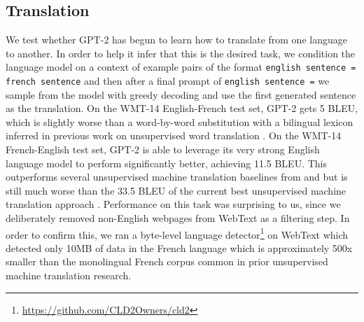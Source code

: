 \documentclass{article}
\begin{document}

\subsection{Translation}

We test whether GPT-2 has begun to learn how to translate from one language to another. In order to help it infer that this is the desired task, we condition the language model on a context of example pairs of the format \texttt{english sentence = french sentence} and then after a final prompt of \texttt{english sentence =} we sample from the model with greedy decoding and use the first generated sentence as the translation. On the WMT-14 English-French test set, GPT-2 gets 5 BLEU, which is slightly worse than a word-by-word substitution with a bilingual lexicon inferred in previous work on unsupervised word translation \cite{conneau2017word}. On the WMT-14 French-English test set, GPT-2 is able to leverage its very strong English language model to perform significantly better, achieving 11.5 BLEU. This outperforms several unsupervised machine translation baselines from \cite{artetxe2017unsupervised} and \cite{lample2017unsupervised} but is still much worse than the 33.5 BLEU of the current best unsupervised machine translation approach \cite{artetxe2019effective}. Performance on this task was surprising to us, since we deliberately removed non-English webpages from WebText as a filtering step. In order to confirm this, we ran a byte-level language detector\footnote{\url{https://github.com/CLD2Owners/cld2}} on WebText which detected only 10MB of data in the French language which is approximately 500x smaller than the monolingual French corpus common in prior unsupervised machine translation research.

\end{document}
